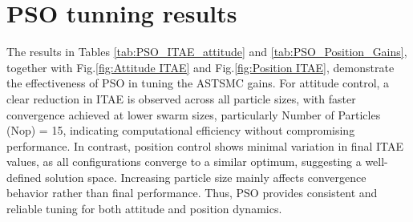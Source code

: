 \begin{table}[htbp]
\centering

\caption{PSO Performance for Different Numbers of Particles in Position Gains Tuning}
\label{tab:PSO_Position_Gains}

\end{table}

\section{PSO tunning results}

The results in Tables \ref{tab:PSO_ITAE_attitude} and \ref{tab:PSO_Position_Gains}, together with  Fig.\ref{fig:Attitude ITAE} and Fig.\ref{fig:Position ITAE}, demonstrate the effectiveness of PSO in tuning the ASTSMC gains. For attitude control, a clear reduction in ITAE is observed across all particle sizes, with faster convergence achieved at lower swarm sizes, particularly Number of Particles (Nop) = 15, indicating computational efficiency without compromising performance. In contrast, position control shows minimal variation in final ITAE values, as all configurations converge to a similar optimum, suggesting a well-defined solution space. Increasing particle size mainly affects convergence behavior rather than final performance. Thus, PSO provides consistent and reliable tuning for both attitude and position dynamics.


